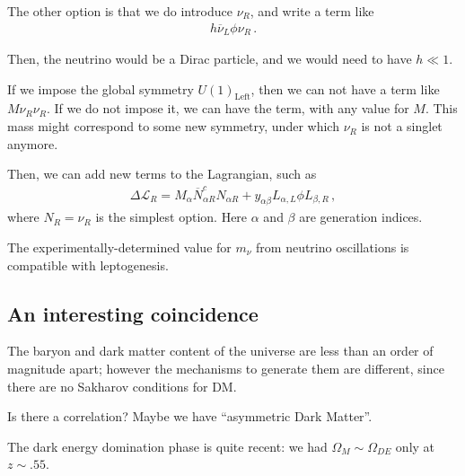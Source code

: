 \documentclass[main.tex]{subfiles}
\begin{document}
The other option is that we do introduce \(\nu_{R}\), and write a term like 
%
\begin{align}
h \overline{\nu}_{L} \phi \nu_{R}
\,.
\end{align}

Then, the neutrino would be a Dirac particle, and we would need to have \(h \ll 1\).

If we impose the global symmetry \(U(1) _{\text{Left}}\), then we can not have a term like \(M \nu_{R} \nu_{R}\). 
If we do not impose it, we can have the term, with any value for \(M\).
This mass might correspond to some new symmetry, under which \(\nu_{R}\) is not a singlet anymore. 

Then, we can add new terms to the Lagrangian, such as 
%
\begin{align}
\Delta \mathscr{L}_{R} = M_{\alpha } \overline{N}^{c}_{\alpha R} N_{\alpha R} + y_{\alpha \beta } L_{\alpha, L} \phi L_{\beta , R}
\,,
\end{align}
%
where \(N_R = \nu_{R}\) is the simplest option. 
Here \(\alpha \) and \(\beta \) are generation indices. 


The experimentally-determined value for \(m_\nu \) from neutrino oscillations is compatible with leptogenesis. 

\subsection{An interesting coincidence}

The baryon and dark matter content of the universe are less than an order of magnitude apart; however the mechanisms to generate them are different, since there are no Sakharov conditions for DM. 

Is there a correlation? Maybe we have ``asymmetric Dark Matter''. 

The dark energy domination phase is quite recent: we had \(\Omega_{M} \sim \Omega_{DE}\) only at \(z \sim \num{.55}\). 



 
\end{document}
